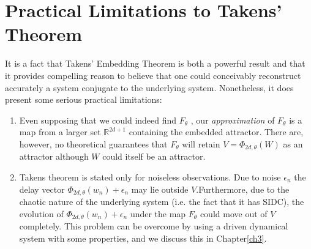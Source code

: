 \documentclass[a4paper,12pt,twoside]{report}
\begin{document}

\section{Practical Limitations to Takens' Theorem}

It is a fact that Takens' Embedding Theorem is both a powerful result and that it provides compelling reason to believe that one could conceivably reconstruct accurately a system conjugate to the underlying system. Nonetheless, it does present some serious practical limitations:
\vspace{-5mm}
\begin{enumerate}
\item Even supposing that we could indeed find $F_\theta$ , our \emph{approximation} of  $F_\theta$ is a map from a larger set $\mathbb{R}^{2d+1}$ containing the embedded attractor. There are, however, no theoretical guarantees that $F_\theta$ will retain  $V=\Phi_{2d,\theta}(W)$  as an attractor although $W$ could itself be an attractor.
\item Takens theorem is stated only for noiseless observations. Due to noise $\epsilon_n$ the delay vector $\Phi_{2d,\theta}(w_n) + \epsilon_n$  may lie outside $V$.Furthermore, due to the chaotic nature of the underlying system (i.e. the fact that it has SIDC), the evolution of $\Phi_{2d,\theta}(w_n) + \epsilon_n$ under the map $F_\theta$ could move out of $V$ completely. This problem can be overcome  by using a driven dynamical system with some properties, and we discuss this in Chapter\ref{ch3}. 
\end{enumerate}


\end{document}
